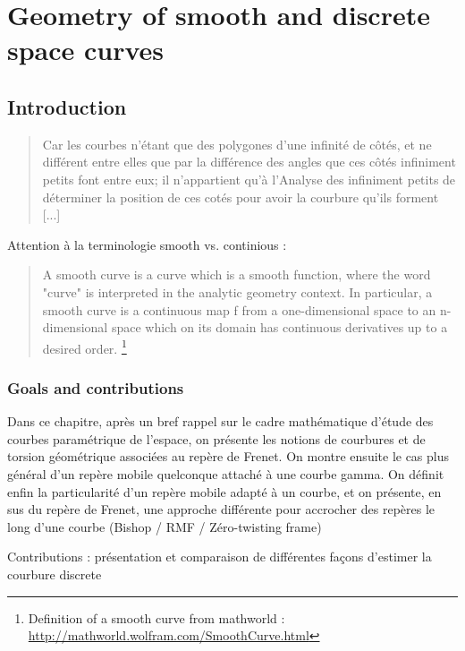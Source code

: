 \chapter{Geometry of smooth and discrete space curves}
\section{Introduction}


\blockcquote[Liebniz]{}{Car les courbes n’étant que des polygones d’une infinité de côtés, et ne différent
entre elles que par la différence des angles que ces côtés infiniment petits font
entre eux; il n’appartient qu’à l’Analyse des infiniment petits de déterminer la
position de ces cotés pour avoir la courbure qu’ils forment [...]}.

Attention à la terminologie smooth vs. continious :

\blockquote{A smooth curve is a curve which is a smooth function, where the word "curve" is interpreted in the analytic geometry context. In particular, a smooth curve is a continuous map f from a one-dimensional space to an n-dimensional space which on its domain has continuous derivatives up to a desired order. \footnote{Definition of a smooth curve from mathworld : \url{http://mathworld.wolfram.com/SmoothCurve.html}}
} 

\subsection{Goals and contributions}
Dans ce chapitre, après un bref rappel sur le cadre mathématique d'étude des courbes paramétrique de l'espace, on présente les notions de courbures et de torsion géométrique associées au repère de Frenet. On montre ensuite le cas plus général d'un repère mobile quelconque attaché à une courbe gamma. On définit enfin la particularité d'un repère mobile adapté à un courbe, et on présente, en sus du repère de Frenet, une approche différente pour accrocher des repères le long d'une courbe (Bishop / RMF / Zéro-twisting frame)

Contributions : présentation et comparaison de différentes façons d'estimer la courbure discrete

